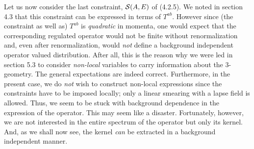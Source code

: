 Let us now consider the last constraint, ${\cal S}(A,E)$ of (4.2.5). We noted
in section 4.3 that this constraint can be expressed in terms of $T^{ab}$.
However since (the constraint as well as) $T^{ab}$ is {\it quadratic} in
momenta, one would expect that the corresponding regulated operator would
not be finite without renormalization and, even after renormalization, would
{\it not} define a background independent operator valued distribution. After
all, this is the reason why we were led in section 5.3 to consider {\it
non-local} variables to carry information about the 3-geometry. The general
expectations are indeed correct. Furthermore, in the present case, we do
{\it not} wish to construct non-local expressions since the constraints have
to be imposed locally; only a linear smearing with a lapse field is allowed.
Thus, we seem to be stuck with background dependence in the expression of the
operator. This may seem like a disaster. Fortunately, however, we are not
interested in the entire spectrum of the operator but only its kernel. And,
as we shall now see, the kernel {\it can} be extracted in a background
independent manner.

